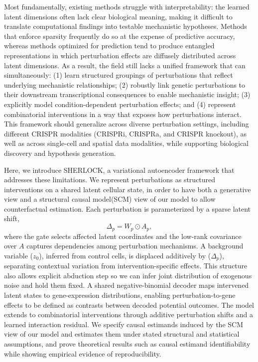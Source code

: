 Most fundamentally, existing methods struggle with interpretability: the learned latent dimensions
often lack clear biological meaning, making it difficult to translate computational findings into
testable mechanistic hypotheses. Methods that enforce sparsity frequently do so at the expense of
predictive accuracy, whereas methods optimized for prediction tend to produce entangled
representations in which perturbation effects are diffusely distributed across latent dimensions. As
a result, the field still lacks a unified framework that can simultaneously: (1) learn structured
groupings of perturbations that reflect underlying mechanistic relationships; (2) robustly link
genetic perturbations to their downstream transcriptional consequences to enable mechanistic insight;
(3) explicitly model condition-dependent perturbation effects{; and (4) represent combinatorial
interventions in a way that exposes how perturbations interact}. This framework should generalize
across diverse perturbation settings, including different CRISPR modalities (CRISPRi, CRISPRa, and
CRISPR knockout), as well as across single-cell and spatial data modalities, while supporting
biological discovery and hypothesis generation.

Here, we introduce SHERLOCK, a variational autoencoder framework that addresses these limitations. We
represent perturbations as structured interventions on a shared latent cellular state, in order to
have both a generative view and a structural causal model(SCM) view of our model to allow
counterfactual estimation. Each perturbation is parameterized by a sparse latent shift,
\[
\Delta_p = W_p \odot A_p,
\]
where the gate selects affected latent coordinates and the low-rank covariance over $A$ captures
dependencies among perturbation mechanisms. {A background variable ($z_0$), inferred from control
cells, is displaced additively by ($\Delta_p$)}, separating contextual variation from
intervention-specific effects. This structure also allows explicit abduction step so we can infer
joint distribution of exogenous noise and hold them fixed. A shared negative-binomial decoder maps
intervened latent states to gene-expression distributions, enabling perturbation-to-gene effects to
be defined as contrasts between decoded potential outcomes. The model extends to combinatorial
interventions through additive perturbation shifts and a learned interaction residual. We specify
causal estimands induced by the SCM view of our model and estimates them under stated structural and
statistical assumptions, and prove theoretical results such as causal estimand identifiability while
showing empirical evidence of reproducibility.

